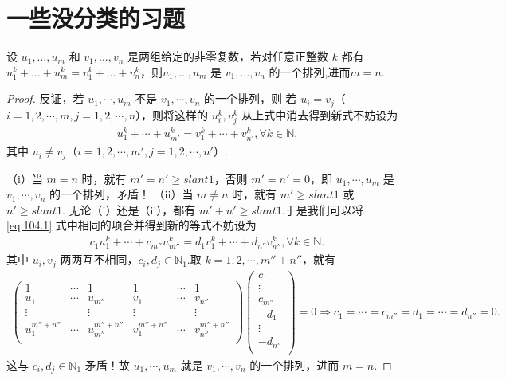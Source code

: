 \documentclass[../../main.tex]{subfiles}
\begin{document}
\section{一些没分类的习题}

\begin{lemma}\label{lemma:引理1564561}
设 $u_1,\dots,u_m$ 和 $v_1,\dots,v_n$ 是两组给定的非零复数，若对任意正整数 $k$ 都有 $u_1^k+\dots+u_m^k=v_1^k+\dots+v_n^k$，则$u_1,\dots,u_m$ 是 $v_1,\dots,v_n$ 的一个排列,进而$m=n$.
\end{lemma}
\begin{proof}
反证，若 $u_1,\cdots ,u_m$ 不是 $v_1,\cdots ,v_n$ 的一个排列，则
若 $u_i=v_j$（$i=1,2,\cdots ,m,j=1,2,\cdots ,n$），则将这样的 $u_{i}^{k},v_{j}^{k}$ 从上式中消去得到新式不妨设为
\begin{align}
u_{1}^{k}+\cdots +u_{m'}^{k}=v_{1}^{k}+\cdots +v_{n'}^{k},\forall k\in \mathbb{N} .\label{eq:104.1}
\end{align}
其中 $u_i\ne v_j$（$i=1,2,\cdots ,m',j=1,2,\cdots ,n'$）.

（i）当 $m=n$ 时，就有 $m' =n' \geqslant slant 1$，否则 $m' =n' =0$，即 $u_1,\cdots ,u_m$ 是 $v_1,\cdots ,v_n$ 的一个排列，矛盾！
（ii）当 $m\ne n$ 时，就有 $m' \geqslant slant 1$ 或 $n' \geqslant slant 1$.
无论（i）还是（ii），都有 $m' +n' \geqslant slant 1$.于是我们可以将 \eqref{eq:104.1} 式中相同的项合并得到新的等式不妨设为
\begin{align*}
c_1u_{1}^{k}+\cdots +c_{m''}u_{m''}^{k}=d_1v_{1}^{k}+\cdots +d_{n''}v_{n''}^{k},\forall k\in \mathbb{N} .
\end{align*}
其中 $u_i,v_j$ 两两互不相同，$c_i,d_j\in \mathbb{N} _1$.取 $k=1,2,\cdots ,m'' +n''$，就有
\begin{align*}
\begin{pmatrix}
1&		\cdots&		1&		1&		\cdots&		1\\
u_1&		\cdots&		u_{m''}&		v_1&		\cdots&		v_{n''}\\
\vdots&		&		\vdots&		\vdots&		&		\vdots\\
u_{1}^{m'' +n''}&		\cdots&		u_{m''}^{m'' +n''}&		v_{1}^{m'' +n''}&		\cdots&		v_{n''}^{m'' +n''}\\
\end{pmatrix} \begin{pmatrix}
c_1\\
\vdots\\
c_{m''}\\
-d_1\\
\vdots\\
-d_{n''}\\
\end{pmatrix} =0\Rightarrow c_1=\cdots =c_{m''}=d_1=\cdots =d_{n''}=0.
\end{align*}
这与 $c_i,d_j\in \mathbb{N} _1$ 矛盾！故 $u_1,\cdots ,u_m$ 就是 $v_1,\cdots ,v_n$ 的一个排列，进而 $m=n$.
\end{proof}
\end{document}
